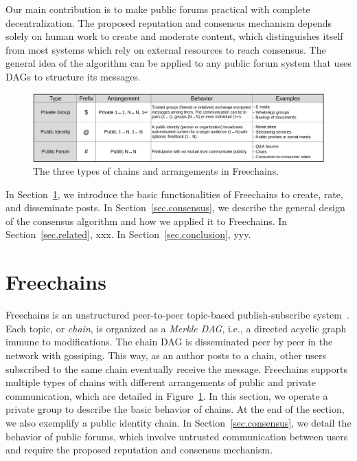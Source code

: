 \documentclass[10pt,journal,compsoc]{IEEEtran}
\newcommand{\FC}       {Freechains\xspace}
\begin{document}
Our main contribution is to make public forums practical with complete
decentralization.
The proposed reputation and consensus mechanism depends solely on human work to
create and moderate content, which distinguishes itself from most systems which
rely on external resources to reach consensus.
The general idea of the algorithm can be applied to any public forum system
that uses DAGs to structure its messages.

\begin{figure}[ht]
\centering
\includegraphics[width=\textwidth]{arrangements.png}
\caption{The three types of chains and arrangements in \FC.}
\label{fig.table}
\end{figure}

In Section~\ref{sec.freechains}, we introduce the basic functionalities of \FC
to create, rate, and disseminate posts.
In Section~\ref{sec.consensus}, we describe the general design of the consensus
algorithm and how we applied it to \FC.
In Section~\ref{sec.related}, xxx.
In Section~\ref{sec.conclusion}, yyy.

\section{Freechains}
\label{sec.freechains}

\FC is an unstructured peer-to-peer topic-based publish-subscribe
system~\cite{fcs.sbseg20}.
Each topic, or \emph{chain}, is organized as a \emph{Merkle DAG}, i.e., a
directed acyclic graph immune to modifications.
The chain DAG is disseminated peer by peer in the network with gossiping.
This way, as an author posts to a chain, other users subscribed to the same
chain eventually receive the message.
\FC supports multiple types of chains with different arrangements of public and
private communication, which are detailed in Figure~\ref{fig.table}.
In this section, we operate a private group to describe the basic behavior of
chains.
At the end of the section, we also exemplify a public identity chain.
In Section~\ref{sec.consensus}, we detail the behavior of public forums, which
involve untrusted communication between users and require the proposed
reputation and consensus mechanism.
\end{document}
